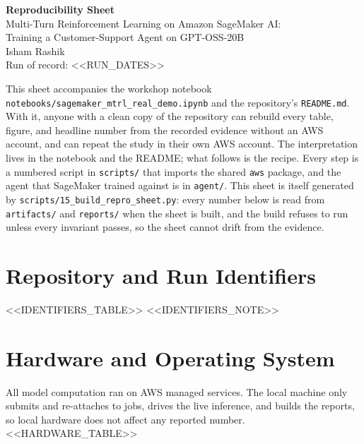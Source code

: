 \documentclass[11pt]{article}
\begin{document}
\begin{center}
{\LARGE\bfseries Reproducibility Sheet}\\[6pt]
{\large Multi-Turn Reinforcement Learning on Amazon SageMaker AI:\\
Training a Customer-Support Agent on GPT-OSS-20B}\\[12pt]
{\large Isham Rashik}\\[4pt]
Run of record: <<RUN_DATES>>
\end{center}

This sheet accompanies the workshop notebook \texttt{notebooks/sagemaker\_mtrl\_real\_demo.ipynb} and the
repository's \texttt{README.md}. With it, anyone with a clean copy of the repository can rebuild every table,
figure, and headline number from the recorded evidence without an AWS account, and can repeat the study in
their own AWS account. The interpretation lives in the notebook and the README; what follows is the recipe.
Every step is a numbered script in \texttt{scripts/} that imports the shared \texttt{aws} package, and the
agent that SageMaker trained against is in \texttt{agent/}. This sheet is itself generated by
\texttt{scripts/15\_build\_repro\_sheet.py}: every number below is read from \texttt{artifacts/} and
\texttt{reports/} when the sheet is built, and the build refuses to run unless every invariant passes, so the
sheet cannot drift from the evidence.

\section{Repository and Run Identifiers}
<<IDENTIFIERS_TABLE>>
<<IDENTIFIERS_NOTE>>

\section{Hardware and Operating System}
All model computation ran on AWS managed services. The local machine only submits and re-attaches to jobs,
drives the live inference, and builds the reports, so local hardware does not affect any reported number.
<<HARDWARE_TABLE>>
\end{document}
